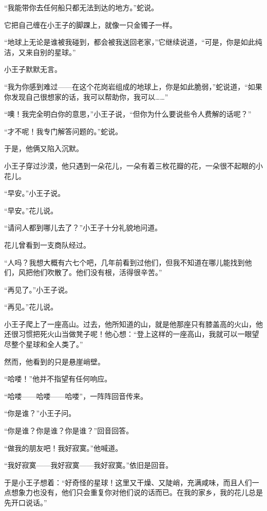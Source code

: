 “我能带你去任何船只都无法到达的地方。”蛇说。

它把自己缠在小王子的脚踝上，就像一只金镯子一样。

“地球上无论是谁被我碰到，都会被我送回老家，”它继续说道，“可是，你是如此纯洁，又来自别的星球。”

小王子默默无言。

“我为你感到难过------在这个花岗岩组成的地球上，你是如此脆弱，”蛇说道，“如果你发现自己很想家的话，我可以帮助你，我可以\ldots{}\ldots{}”

“噢！我完全明白你的意思，”小王子说，“但你为什么要说些令人费解的话呢？”

“才不呢！我专门解答问题的。”蛇说。

于是，他俩又陷入沉默。


\stoptitle

\starttitle[title={18}]

小王子穿过沙漠，他只遇到一朵花儿，一朵有着三枚花瓣的花，一朵很不起眼的小花儿。

“早安。”小王子说。

“早安。”花儿说。

“请问人都到哪儿去了？”小王子十分礼貌地问道。

花儿曾看到一支商队经过。

“人吗？我想大概有六七个吧，几年前看到过他们，但我不知道在哪儿能找到他们，风把他们吹散了。他们没有根，活得很辛苦。”

“再见了。”小王子说。

“再见。”花儿说。


\stoptitle

\starttitle[title={19}]

小王子爬上了一座高山。过去，他所知道的山，就是他那座只有膝盖高的火山，他还很习惯把死火山当做凳子呢！他心想：“登上这样的一座高山，我就可以一眼望尽整个星球和全人类了。”

然而，他看到的只是悬崖峭壁。

“哈喽！”他并不指望有任何响应。

“哈喽------哈喽------哈喽”，一阵阵回音传来。

“你是谁？”小王子问。

“你是谁？你是谁？你是谁？”回音回答。

“做我的朋友吧！我好寂寞。”他喊道。

“我好寂寞------我好寂寞------我好寂寞。”依旧是回音。

于是小王子想着：“好奇怪的星球！这里又干燥、又陡峭，充满咸味，而且人们一点想象力也没有，他们只会重复你对他们说的话而已。在我的家乡，我的花儿总是先开口说话。”

